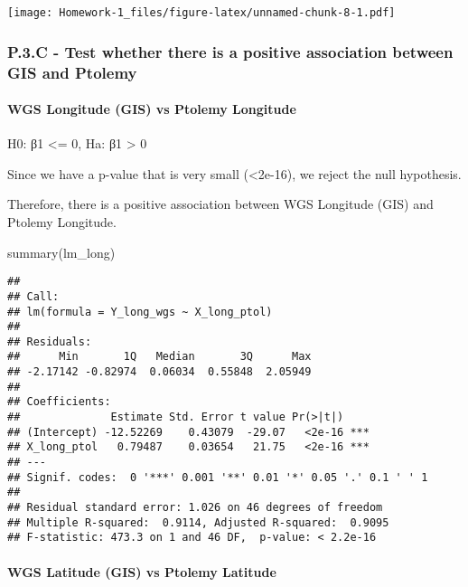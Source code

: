 \documentclass[
]{article}
\newenvironment{Shaded}{\begin{snugshade}}{\end{snugshade}}
\newcommand{\FunctionTok}[1]{\textcolor[rgb]{0.00,0.00,0.00}{#1}}
\newcommand{\NormalTok}[1]{#1}
\begin{document}
\texttt{[image: Homework-1\_files/figure-latex/unnamed-chunk-8-1.pdf]}

\hypertarget{p.3.c---test-whether-there-is-a-positive-association-between-gis-and-ptolemy}{%
\subsubsection{P.3.C - Test whether there is a positive association
between GIS and
Ptolemy}\label{p.3.c---test-whether-there-is-a-positive-association-between-gis-and-ptolemy}}

\hypertarget{wgs-longitude-gis-vs-ptolemy-longitude}{%
\paragraph{WGS Longitude (GIS) vs Ptolemy
Longitude}\label{wgs-longitude-gis-vs-ptolemy-longitude}}

H0: β1 \textless= 0, Ha: β1 \textgreater{} 0

Since we have a p-value that is very small (\textless2e-16), we reject
the null hypothesis.

Therefore, there is a positive association between WGS Longitude (GIS)
and Ptolemy Longitude.

\begin{Shaded}
\begin{Highlighting}[]
\FunctionTok{summary}\NormalTok{(lm\_long)}
\end{Highlighting}
\end{Shaded}

\begin{verbatim}
## 
## Call:
## lm(formula = Y_long_wgs ~ X_long_ptol)
## 
## Residuals:
##      Min       1Q   Median       3Q      Max 
## -2.17142 -0.82974  0.06034  0.55848  2.05949 
## 
## Coefficients:
##              Estimate Std. Error t value Pr(>|t|)    
## (Intercept) -12.52269    0.43079  -29.07   <2e-16 ***
## X_long_ptol   0.79487    0.03654   21.75   <2e-16 ***
## ---
## Signif. codes:  0 '***' 0.001 '**' 0.01 '*' 0.05 '.' 0.1 ' ' 1
## 
## Residual standard error: 1.026 on 46 degrees of freedom
## Multiple R-squared:  0.9114, Adjusted R-squared:  0.9095 
## F-statistic: 473.3 on 1 and 46 DF,  p-value: < 2.2e-16
\end{verbatim}

\hypertarget{wgs-latitude-gis-vs-ptolemy-latitude}{%
\paragraph{WGS Latitude (GIS) vs Ptolemy
Latitude}\label{wgs-latitude-gis-vs-ptolemy-latitude}}
\end{document}
